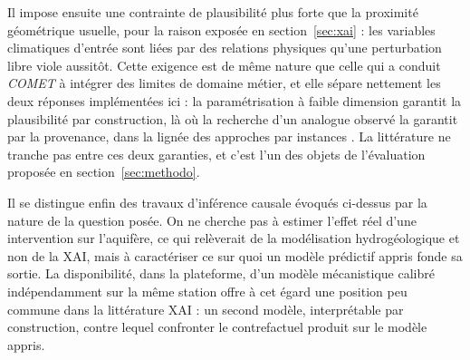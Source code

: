 Il impose ensuite une contrainte de plausibilité plus forte que la proximité géométrique usuelle, pour la raison exposée en section~\ref{sec:xai} : les variables climatiques d'entrée sont liées par des relations physiques qu'une perturbation libre viole aussitôt. Cette exigence est de même nature que celle qui a conduit \textit{COMET} \cite{wang2024comet} à intégrer des limites de domaine métier, et elle sépare nettement les deux réponses implémentées ici : la paramétrisation à faible dimension garantit la plausibilité par construction, là où la recherche d'un analogue observé la garantit par la provenance, dans la lignée des approches par instances \cite{delaney2021instance, ates2021comte}. La littérature ne tranche pas entre ces deux garanties, et c'est l'un des objets de l'évaluation proposée en section~\ref{sec:methodo}.

Il se distingue enfin des travaux d'inférence causale évoqués ci-dessus par la nature de la question posée. On ne cherche pas à estimer l'effet réel d'une intervention sur l'aquifère, ce qui relèverait de la modélisation hydrogéologique et non de la XAI, mais à caractériser ce sur quoi un modèle prédictif appris fonde sa sortie. La disponibilité, dans la plateforme, d'un modèle mécanistique calibré indépendamment sur la même station offre à cet égard une position peu commune dans la littérature XAI : un second modèle, interprétable par construction, contre lequel confronter le contrefactuel produit sur le modèle appris.
